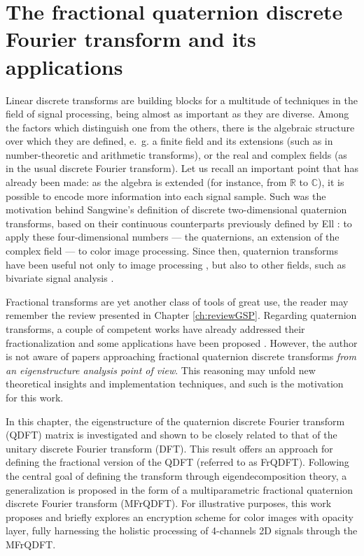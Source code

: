 \chapter{The fractional quaternion discrete Fourier transform and its applications}
\label{ch:FrQDFT}

Linear discrete transforms are building blocks for a multitude of techniques in the field of signal processing, being almost as important as they are diverse. Among the factors which distinguish one from the others, there is the algebraic structure over which they are defined, e.~g. a finite field and its extensions (such as in number-theoretic \cite{blahut2010fast,pedrouzo2017number,chandra2014exact,lima2013} and arithmetic \cite{knockaert1994generalized, rajapaksha2014vlsi} transforms), or the real and complex fields (as in the usual discrete Fourier transform). Let us recall an important point that has already been made: as the algebra is extended (for instance, from $ \mathbb{R} $ to $ \mathbb{C} $), it is possible to encode more information into each signal sample. Such was the motivation behind Sangwine's definition \cite{sangwine1996fourier} of discrete two-dimensional quaternion transforms, based on their continuous counterparts previously defined by Ell \cite{ell1993quaternion}: to apply these four-dimensional numbers --- the quaternions, an extension of the complex field --- to color image processing. Since then, quaternion transforms have been useful not only to image processing \cite{ell2007hypercomplex,chen2018quaternion,li2013quaternion,evans2000hypercomplex,silva2018}, but also to other fields, such as bivariate signal analysis \cite{flamant2017spectral,flamant2017time,flamant2018complete}.

Fractional transforms are yet another class of tools of great use, the reader may remember the review presented in Chapter \ref{ch:reviewGSP}. Regarding quaternion transforms, a couple of competent works have already addressed their fractionalization \cite{guanlei2008fractional, wei2013different, roopkumar2016quaternionic} and some applications have been proposed \cite{chen2018quaternion}. However, the author is not aware of papers approaching fractional quaternion discrete transforms \textit{from an eigenstructure analysis point of view}. This reasoning may unfold new theoretical insights and implementation techniques, and such is the motivation for this work.

In this chapter, the eigenstructure of the quaternion discrete Fourier transform (QDFT) matrix is investigated and shown to be closely related to that of the unitary discrete Fourier transform (DFT). This result offers an approach for defining the fractional version of the QDFT (referred to as FrQDFT). Following the central goal of defining the transform through eigendecomposition theory, a generalization is proposed in the form of a multiparametric fractional quaternion discrete Fourier transform (MFrQDFT). For illustrative purposes, this work proposes and briefly explores an encryption scheme for color images with opacity layer, fully harnessing the holistic processing of 4-channels 2D signals through the MFrQDFT.

